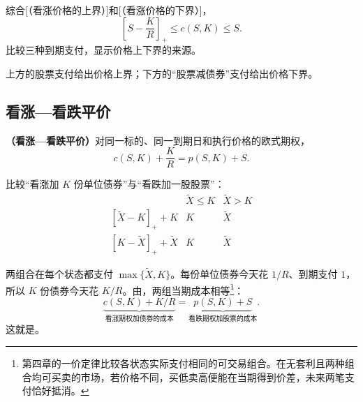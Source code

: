 综合[（看涨价格的上界）]和[（看涨价格的下界）]，
\begin{equation}
 \left[S-\frac K R\right]_+\le c(S,K)\le S.
 \label{eq:wj-five-2}
\end{equation}
 比较三种到期支付，显示价格上下界的来源。
\begin{center}
\begin{minipage}{\linewidth}
%
\centering
{}
\end{minipage}
\end{center}
上方的股票支付给出价格上界；下方的“股票减债券”支付给出价格下界。

\subsection{看涨—看跌平价}
\begin{tcolorbox}[knowledge]
\textbf{（看涨—看跌平价）}对同一标的、同一到期日和执行价格的欧式期权，
\begin{equation}
 c(S,K)+\frac K R=p(S,K)+S.
 \label{eq:wj-five-3}
\end{equation}
\end{tcolorbox}
\begin{solution}[label-content={证明},blank-type=none]
比较“看涨加 $K$ 份单位债券”与“看跌加一股股票”：
\[
\begin{array}{c|cc}
 &\tilde X\le K&\tilde X>K\\\hline
 [\tilde X-K]_++K&K&\tilde X\\
 {}[K-\tilde X]_++\tilde X&K&\tilde X
\end{array}
\]

两组合在每个状态都支付 $\max\{\tilde X,K\}$。每份单位债券今天花 $1/R$、到期支付 $1$，所以 $K$ 份债券今天花 $K/R$。由，两组当期成本相等\footnote{第四章的一价定律比较各状态实际支付相同的可交易组合。在无套利且两种组合均可买卖的市场，若价格不同，买低卖高便能在当期得到价差，未来两笔支付恰好抵消。}：
\[
 \underbrace{c(S,K)+K/R}_{\text{看涨期权加债券的成本}}
 =\underbrace{p(S,K)+S}_{\text{看跌期权加股票的成本}}.
\]
这就是。
\end{solution}

